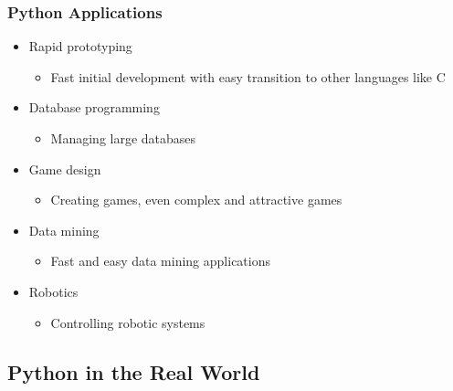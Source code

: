 \documentclass[mini frame in current subsection]{beamer}
\begin{document}
		\begin{frame}
			\frametitle{Python Applications}
			\begin{itemize}
				\vfill \item  Rapid prototyping
					\begin{itemize}
						\item  Fast initial development with easy transition to other languages like C
					\end{itemize}
				\vfill \item  Database programming
					\begin{itemize}
						\item  Managing large databases
					\end{itemize}
				\vfill \item  Game design
					\begin{itemize}
						\item  Creating games, even complex and attractive games
					\end{itemize}
				\vfill \item  Data mining
					\begin{itemize}
						\item  Fast and easy data mining applications
					\end{itemize}
				\vfill \item  Robotics
					\begin{itemize}
						\item  Controlling robotic systems
					\end{itemize}
			\end{itemize}
		\end{frame}
		
	\subsection{Python in the Real World}
	
\end{document}
